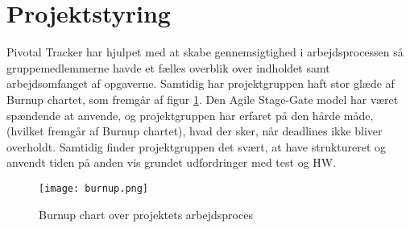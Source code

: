 \section{Projektstyring}
Pivotal Tracker har hjulpet med at skabe gennemsigtighed i arbejdsprocessen så gruppemedlemmerne havde et fælles overblik over indholdet samt arbejdsomfanget af opgaverne.   Samtidig har projektgruppen haft stor glæde af Burnup chartet, som fremgår af figur \ref{fig:burnup}. 
Den Agile Stage-Gate model har været spændende at anvende, og projektgruppen har erfaret på den hårde måde, (hvilket fremgår af Burnup chartet), hvad der sker, når deadlines ikke bliver overholdt. Samtidig finder projektgruppen det svært, at have struktureret og anvendt tiden på anden vis grundet udfordringer med test og HW. 
\hspace{1.5cm}
\begin{figure}[H]
\centering
\texttt{[image: burnup.png]}
\caption{Burnup chart over projektets arbejdsproces}
\label{fig:burnup}
\end{figure}

 


